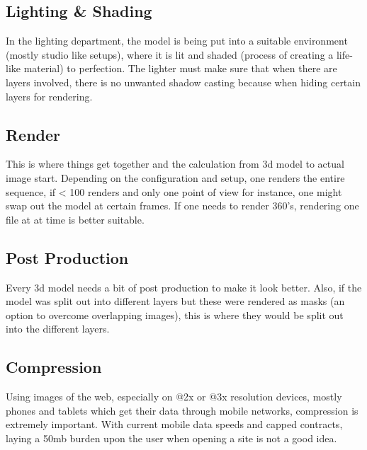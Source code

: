 \subsection{Lighting \& Shading}
In the lighting department, the model is being put into a suitable environment (mostly studio like setups), where it is lit and shaded (process of creating a life-like material) to perfection. The lighter must make sure that when there are layers involved, there is no unwanted shadow casting because when hiding certain layers for rendering.

\subsection{Render}
This is where things get together and the calculation from 3d model to actual image start. Depending on the configuration and setup, one renders the entire sequence, if < 100 renders and only one point of view for instance, one might swap out the model at certain frames. If one needs to render 360's, rendering one file at at time is better suitable.

\subsection{Post Production}
Every 3d model needs a bit of post production to make it look better. Also, if the model was split out into different layers but these were rendered as masks (an option to overcome overlapping images), this is where they would be split out into the different layers.

\subsection{Compression}
Using images of the web, especially on @2x or @3x resolution devices, mostly phones and tablets which get their data through mobile networks, compression is extremely important. With current mobile data speeds and capped contracts, laying a 50mb burden upon the user when opening a site is not a good idea.

